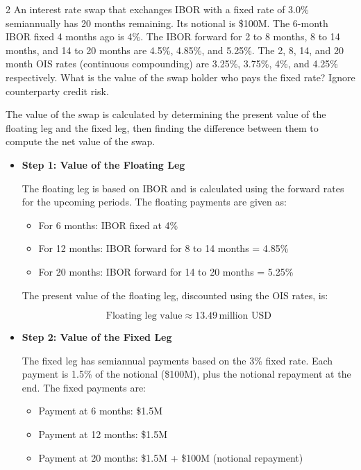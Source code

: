 \documentclass[12pt,letterpaper, onecolumn]{exam}
\begin{document}
\newpage

\begin{question} 2
An interest rate swap that exchanges IBOR with a fixed rate of 3.0\% semiannually has 20 months remaining. Its notional is \$100M. The 6-month IBOR fixed 4 months ago is 4\%. The IBOR forward for 2 to 8 months, 8 to 14 months, and 14 to 20 months are 4.5\%, 4.85\%, and 5.25\%. The 2, 8, 14, and 20 month OIS rates (continuous compounding) are 3.25\%, 3.75\%, 4\%, and 4.25\% respectively. What is the value of the swap holder who pays the fixed rate? Ignore counterparty credit risk.
\end{question}


\begin{solution}

The value of the swap is calculated by determining the present value of the floating leg and the fixed leg, then finding the difference between them to compute the net value of the swap.

\begin{itemize}
    \item \textbf{Step 1: Value of the Floating Leg}

    The floating leg is based on IBOR and is calculated using the forward rates for the upcoming periods. The floating payments are given as:
    
    \begin{itemize}
        \item For 6 months: IBOR fixed at 4\%
        \item For 12 months: IBOR forward for 8 to 14 months = 4.85\%
        \item For 20 months: IBOR forward for 14 to 20 months = 5.25\%
    \end{itemize}
    
    The present value of the floating leg, discounted using the OIS rates, is:
    
    \[
    \text{Floating leg value} \approx 13.49 \, \text{million USD}
    \]
    
    \item \textbf{Step 2: Value of the Fixed Leg}
    
    The fixed leg has semiannual payments based on the 3\% fixed rate. Each payment is 1.5\% of the notional (\$100M), plus the notional repayment at the end. The fixed payments are:
    
    \begin{itemize}
        \item Payment at 6 months: \$1.5M
        \item Payment at 12 months: \$1.5M
        \item Payment at 20 months: \$1.5M + \$100M (notional repayment)
    \end{itemize}
    

\end{itemize}
\end{solution}
\end{document}

